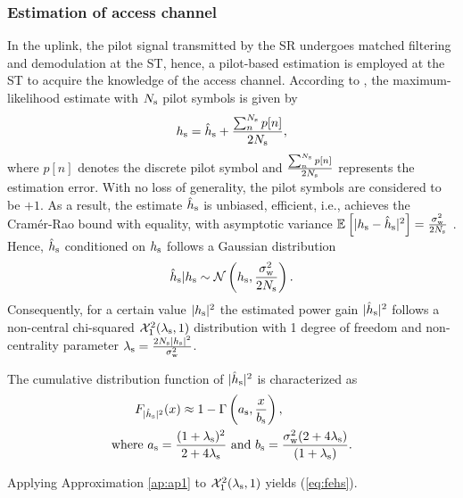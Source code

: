 \subsubsection{Estimation of access channel}
In the uplink, the pilot signal transmitted by the SR undergoes matched filtering and demodulation at the ST, hence, a pilot-based estimation is employed at the ST to acquire the knowledge of the access channel. According to \cite{Gifford08}, the maximum-likelihood estimate with $N_{\text{s}}$ pilot symbols is given by 
\begin{align}
h_{\text{s}} = \hat{h}_{\text{s}} + \frac{\sum^{N_{\text{s}}}_{n} p[n]}{2 N_{\text{s}}},
\label{eq:pilot_MLE}
\end{align}
where $p[n]$ denotes the discrete pilot symbol and $\frac{\sum^{N_{\text{s}}}_{n} p[n]}{2 N_{\text{s}}}$ represents the estimation error. With no loss of generality, the pilot symbols are considered to be $+1$.
As a result, the estimate $\hat{h}_{\text{s}}$ is unbiased, efficient, i.e., achieves the Cram\'er-Rao bound with equality, with asymptotic variance ${\mathbb E}_{}\left[ |h_{\text{s}} -\hat{h}_{\text{s}}|^2 \right] = \frac{\sigma^2_{\text{w}}}{2 N_{\text{s}}}$ \cite{Gifford08}. Hence, $\hat{h}_{\text{s}}$ conditioned on $h_{\text{s}}$ follows a Gaussian distribution
\begin{align}
\hat{h}_{\text{s}}|h_{\text{s}} \sim \mathcal{N}\left( h_{\text{s}},\frac{\sigma^2_{\text{w}}}{2 N_{\text{s}}} \right).
\label{eq:ehs} 
\end{align}
Consequently, for a certain value $|h_{\text{s}}|^2$ the estimated power gain $|\hat{h}_{\text{s}}|^2$ follows a non-central chi-squared $\ncchi2(\ls, 1)$ distribution with 1 degree of freedom and non-centrality parameter $\lambda_{\text{s}} = \frac{2 N_{\text{s}} |h_{\text{s}}|^2}{\sigma^2_{\text{w}}}$. 
\begin{lemma} \label{lm:lm2}
\normalfont
The cumulative distribution function of $|\hat{h}_{\text{s}}|^2$ is characterized as 
\begin{align}
F_{|\hat{h}_{\text{s}}|^2}(x) \approx 1 - \Gamma&\left(a_{\text{s}}, \frac{x}{b_{\text{s}}}\right) \label{eq:fehs},\\ 
\text{where  } a_{\text{s}} = \frac{(1 + \lambda_{\text{s}})^2}{2 + 4 \lambda_{\text{s}}} &\text{ and } b_{\text{s}} = \frac{\sigma^2_{\text{w}} (2 + 4 \lambda_{\text{s}})}{(1 + \lambda_{\text{s}})}. \label{eq:para_s} 
\end{align} 
\end{lemma}
\begin{IEEEproof}
Applying Approximation \ref{ap:ap1} to $\ncchi2(\ls,1 )$ yields (\ref{eq:fehs}). 
\end{IEEEproof}

